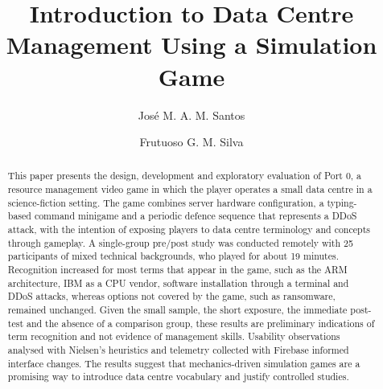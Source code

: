 \documentclass[runningheads]{llncs}
\begin{document}
%
\title{Introduction to Data Centre Management Using a Simulation Game} %
%
%
\author{José M. A. M. Santos \and
Frutuoso G. M. Silva}

%
%
\maketitle              %
%
\begin{abstract}
This paper presents the design, development and exploratory evaluation of Port 0, a resource management video game in which the player operates a small data centre in a science-fiction setting. The game combines server hardware configuration, a typing-based command minigame and a periodic defence sequence that represents a DDoS attack, with the intention of exposing players to data centre terminology and concepts through gameplay. A single-group pre/post study was conducted remotely with 25 participants of mixed technical backgrounds, who played for about 19 minutes. Recognition increased for most terms that appear in the game, such as the ARM architecture, IBM as a CPU vendor, software installation through a terminal and DDoS attacks, whereas options not covered by the game, such as ransomware, remained unchanged. Given the small sample, the short exposure, the immediate post-test and the absence of a comparison group, these results are preliminary indications of term recognition and not evidence of management skills. Usability observations analysed with Nielsen's heuristics \cite{nielsen1994enhancing} and telemetry collected with Firebase informed interface changes. The results suggest that mechanics-driven simulation games are a promising way to introduce data centre vocabulary and justify controlled studies.

\end{abstract}
%
%
%
\end{document}

